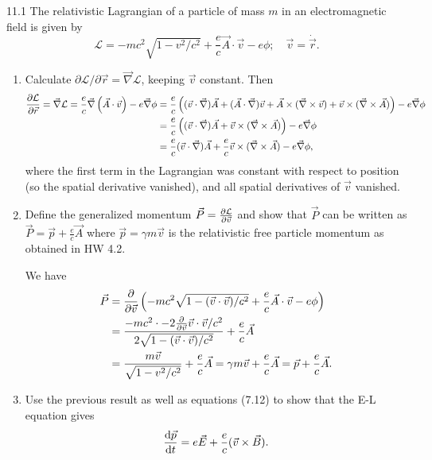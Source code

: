 \documentclass[11pt]{article}
\newcommand{\br}[1]{\left(#1\right)}
\begin{document}
11.1 The relativistic Lagrangian of a particle of mass $m$ in an electromagnetic field is given by \[\mathcal{L} = -mc^2\sqrt{1-v^2/c^2} + \frac{e}{c}\vec{A}\cdot\vec{v}-e\phi;\quad \vec{v} = \dot{\vec{r}}.\]
\begin{enumerate}[label=(\alph*)]
    \item Calculate $\partial \mathcal{L}/\partial \vec{r} = \vec{\nabla}\mathcal{L}$, keeping $\vec{v}$ constant. Then
    \begin{align*}
        \pdv{\mathcal{L}}{\vec{r}} = \vec{\nabla}\mathcal{L} = \frac{e}{c}\vec{\nabla}\br{\vec{A}\cdot\vec{v}} - e\vec{\nabla}\phi &= \frac{e}{c}\br{ (\vec{v}\cdot\vec{\nabla})\vec{A} + (\vec{A}\cdot\vec{\nabla})\vec{v} + \vec{A}\times (\vec{\nabla}\times \vec{v}) + \vec{v}\times (\vec{\nabla}\times \vec{A}) } - e\vec{\nabla}\phi \\
        &= \frac{e}{c}\br{ (\vec{v}\cdot\vec{\nabla})\vec{A} + \vec{v}\times (\vec{\nabla}\times \vec{A})} - e\vec{\nabla}\phi\\
        &= \frac{e}{c} (\vec{v}\cdot\vec{\nabla})\vec{A} + \frac{e}{c}\vec{v}\times (\vec{\nabla}\times \vec{A})  - e\vec{\nabla}\phi,
    \end{align*} where the first term in the Lagrangian was constant with respect to position (so the spatial derivative vanished), and all spatial derivatives of $\vec{v}$ vanished.
    
    \item Define the generalized momentum $\vec{P} = \pdv{\mathcal{L}}{\vec{v}}$ and show that $\vec{P}$ can be written as $\vec{P} = \vec{p} + \frac{e}{c}\vec{A}$ where $\vec{p} = \gamma m\vec{v}$ is the relativistic free particle momentum as obtained in HW 4.2.
    
    We have
    \begin{align*}
        \vec{P} &= \pdv{\vec{v}} \br{-mc^2\sqrt{1-(\vec{v}\cdot \vec{v})/c^2} + \frac{e}{c}\vec{A}\cdot\vec{v}-e\phi} \\
        &= \frac{-mc^2\cdot -2\pdv{\vec{v}}\vec{v}\cdot \vec{v}/c^2 }{2\sqrt{1-(\vec{v}\cdot \vec{v})/c^2}} + \frac{e}{c}\vec{A}\\
        &= \frac{m\vec{v}}{\sqrt{1-v^2/c^2}} + \frac{e}{c}\vec{A} = \gamma m\vec{v} + \frac{e}{c}\vec{A} = \vec{p} + \frac{e}{c}\vec{A}.
    \end{align*}
    
    \item Use the previous result as well as equations (7.12) to show that the E-L equation gives \[\dv{\vec{p}}{t} = e\vec{E} + \frac{e}{c}(\vec{v}\times \vec{B}).\]
    

\end{enumerate}
\end{document}
